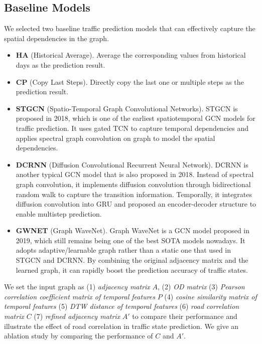 \subsection{Baseline Models}
We selected two baseline traffic prediction models that can effectively capture the spatial dependencies in the graph.

\begin{itemize}
    \item \textbf{HA} (Historical Average). Average the corresponding values from historical days as the prediction result.
    \item \textbf{CP} (Copy Last Steps). Directly copy the last one or multiple steps as the prediction result.
    \item \textbf{STGCN}\cite{STGCN} (Spatio-Temporal Graph Convolutional Networks). STGCN is proposed in 2018, which is one of the earliest spatiotemporal GCN models for traffic prediction. It uses gated TCN\cite{TCN} to capture temporal dependencies and applies spectral graph convolution\cite{GCN0} on graph to model the spatial dependencies.
    \item \textbf{DCRNN}\cite{DCRNN} (Diffusion Convolutional Recurrent Neural Network). DCRNN is another typical GCN model that is also proposed in 2018. Instead of spectral graph convolution, it implements diffusion convolution through bidirectional random walk to capture the transition information. Temporally, it integrates diffusion convolution into GRU and proposed an encoder-decoder structure to enable multistep prediction.
    \item \textbf{GWNET}\cite{GWNET} (Graph WaveNet). Graph WaveNet is a GCN model proposed in 2019, which still remains being one of the best SOTA models nowadays. It adopts adaptive/learnable graph rather than a static one that used in STGCN and DCRNN. By combining the original adjacency matrix and the learned graph, it can rapidly boost the prediction accuracy of traffic states.
\end{itemize}

We set the input graph as (1) \textit{adjacency matrix} $A$, (2) \textit{OD matrix} (3) \textit{Pearson correlation coefficient matrix of temporal features} $P$ (4) \textit{cosine similarity matrix of temporal features} (5) \textit{DTW distance of temporal features} (6) \textit{road correlation matrix} $C$ (7) \textit{refined adjacency matrix} $A'$ to compare their performance and illustrate the effect of road correlation in traffic state prediction. We give an ablation study by comparing the performance of $C$ and $A'$.

